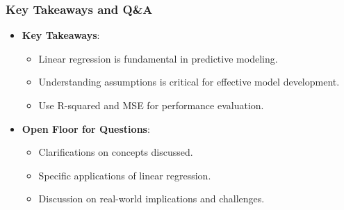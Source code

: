 \documentclass[aspectratio=169]{beamer}
\begin{document}
\begin{frame}[fragile]
    \frametitle{Key Takeaways and Q\&A}
    \begin{itemize}
        \item \textbf{Key Takeaways}:
        \begin{itemize}
            \item Linear regression is fundamental in predictive modeling.
            \item Understanding assumptions is critical for effective model development.
            \item Use R-squared and MSE for performance evaluation.
        \end{itemize}
        \item \textbf{Open Floor for Questions}:
        \begin{itemize}
            \item Clarifications on concepts discussed.
            \item Specific applications of linear regression.
            \item Discussion on real-world implications and challenges.
        \end{itemize}
    \end{itemize}
\end{frame}
\end{document}
